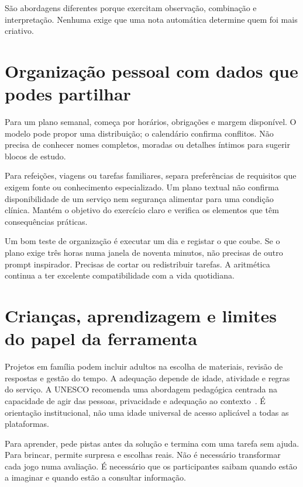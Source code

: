 São abordagens diferentes porque exercitam observação, combinação e interpretação. Nenhuma exige que uma nota automática determine quem foi mais criativo.

\section{Organização pessoal com dados que podes partilhar}
Para um plano semanal, começa por horários, obrigações e margem disponível. O modelo pode propor uma distribuição; o calendário confirma conflitos. Não precisa de conhecer nomes completos, moradas ou detalhes íntimos para sugerir blocos de estudo.

Para refeições, viagens ou tarefas familiares, separa preferências de requisitos que exigem fonte ou conhecimento especializado. Um plano textual não confirma disponibilidade de um serviço nem segurança alimentar para uma condição clínica. Mantém o objetivo do exercício claro e verifica os elementos que têm consequências práticas.

Um bom teste de organização é executar um dia e registar o que coube. Se o plano exige três horas numa janela de noventa minutos, não precisas de outro prompt inspirador. Precisas de cortar ou redistribuir tarefas. A aritmética continua a ter excelente compatibilidade com a vida quotidiana.

\section{Crianças, aprendizagem e limites do papel da ferramenta}
Projetos em família podem incluir adultos na escolha de materiais, revisão de respostas e gestão do tempo. A adequação depende de idade, atividade e regras do serviço. A UNESCO recomenda uma abordagem pedagógica centrada na capacidade de agir das pessoas, privacidade e adequação ao contexto~\citep{unesco2023}. É orientação institucional, não uma idade universal de acesso aplicável a todas as plataformas.

Para aprender, pede pistas antes da solução e termina com uma tarefa sem ajuda. Para brincar, permite surpresa e escolhas reais. Não é necessário transformar cada jogo numa avaliação. É necessário que os participantes saibam quando estão a imaginar e quando estão a consultar informação.

